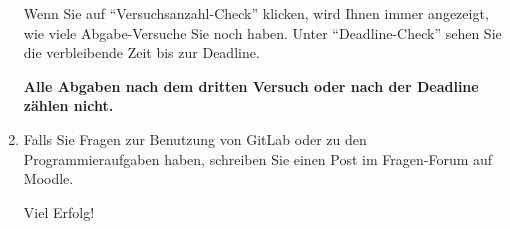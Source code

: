 \documentclass{scrartcl}
\begin{document}
\begin{enumerate}
		\vfill
		
		\begin{tcolorbox}[title=\faLightbulbO\space Hinweis,colbacktitle=hintboxcolor,colframe=hintboxcolor]
			Wenn Sie auf \enquote{Versuchsanzahl-Check} klicken, wird Ihnen immer angezeigt, wie viele Abgabe-Versuche Sie noch haben.
			Unter \enquote{Deadline-Check} sehen Sie die verbleibende Zeit bis zur Deadline.
			
			\bfseries Alle Abgaben nach dem dritten Versuch oder nach der Deadline zählen nicht.
		\end{tcolorbox}
	
		\vfill
		
		\item Falls Sie Fragen zur Benutzung von GitLab oder zu den Programmieraufgaben haben, schreiben Sie einen Post im Fragen-Forum auf Moodle.
		
		\vfill
		
		{\Huge Viel Erfolg!}
		
		\vspace{3cm}
	\end{enumerate}
\end{document}
